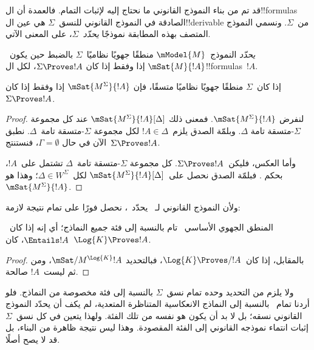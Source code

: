 \documentclass[../../../include/open-logic-section]{subfiles}
\begin{document}


قد تم من بناء النموذج القانوني ما نحتاج إليه لإثبات التمام.
فالعمدة أن ال!!{formula}s الصادقة في النموذج القانوني للنسق~$\Sigma$
هي عين ال!!{derivable} من~$\Sigma$.
ونسمي النموذج المتصف بهذه المطابقة نموذجًا \emph{يحدّد}~$\Sigma$،
على المعنى الآتي.

\begin{defn}
  \emph{يحدّد} النموذج~$\mModel{M}$ منطقًا جهويًا نظاميًا~$\Sigma$
  بالضبط حين يكون~$\mSat{M}{!A}$ إذا وفقط إذا كان
  $\Sigma \Proves !A$، لكل ال!!{formula}s~$!A$.
\end{defn}

\begin{thm}[التحديد]
  إذا كان~$\Sigma$ منطقًا جهويًا نظاميًا متسقًا، فإن
  $\mSat{M^\Sigma}{!A}$ إذا وفقط إذا كان~$\Sigma \Proves !A$.
\end{thm}

\begin{proof}
  لنفرض $\mSat{M^\Sigma}{!A}$. فمعنى ذلك
  $\mSat{M^\Sigma}{!A}[\Delta]$ عند كل مجموعة $\Sigma$-متسقة تامة
  $\Delta$. وبلمّة الصدق يلزم~$!A \in \Delta$ لكل مجموعة
  $\Sigma$-متسقة تامة~$\Delta$.
  نطبق الآن 
  في حال $ \Gamma = \emptyset$، فنستنتج~$\Sigma \Proves !A$.

  وأما العكس، فليكن~$\Sigma \Proves !A$.
  كل مجموعة $\Sigma$-متسقة تامة~$\Delta$ تشتمل على~$!A$،
  بحكم .
  فبلمّة الصدق نحصل على~$\mSat{M^\Sigma}{!A}[\Delta]$ لكل~$\Delta \in
  W^\Sigma$؛ وهذا هو~$\mSat{M^\Sigma}{!A}$.
\end{proof}

ولأن النموذج القانوني لـ~ يحدّد~، نحصل فورًا على تمام
 نتيجة لازمة:

\begin{cor}
  المنطق الجهوي الأساسي~ تام بالنسبة إلى فئة جميع النماذج؛
  أي إنه إذا كان~$\Entails !A$، كان~$\Log{K} \Proves !A$.
\end{cor}

\begin{proof}
  بالمقابل، إذا كان~$\Log{K} \Proves/ !A$، فبالتحديد
  $\mSat/{M^{\Log{K}}}{!A}$، ومن ثم ليست~$!A$ صالحة.
\end{proof}

ولا يلزم من التحديد وحده تمام نسق~$\Sigma$ بالنسبة إلى فئة مخصوصة
من النماذج. فلو أردنا تمام~ بالنسبة إلى النماذج الانعكاسية
المتناظرة المتعدية، لم يكف أن يحدّد النموذج القانوني نسقه؛ بل لا بد
أن يكون هو نفسه من تلك الفئة. ولهذا يتعين في كل نسق~$\Sigma$
إثبات انتماء نموذجه القانوني إلى الفئة المقصودة.
وهذا ليس نتيجة ظاهرة من البناء، بل قد لا يصح أصلًا.
\end{document}

